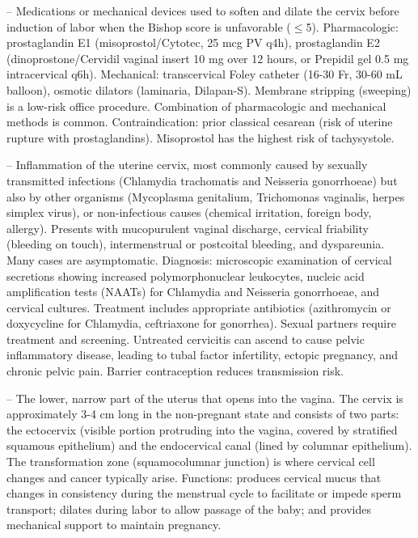 -- Medications or mechanical devices used to soften and dilate the cervix before induction of labor when the Bishop score is unfavorable (\(\le\)5). Pharmacologic: prostaglandin E1 (misoprostol/Cytotec, 25 mcg PV q4h), prostaglandin E2 (dinoprostone/Cervidil vaginal insert 10 mg over 12 hours, or Prepidil gel 0.5 mg intracervical q6h). Mechanical: transcervical Foley catheter (16-30 Fr, 30-60 mL balloon), osmotic dilators (laminaria, Dilapan-S). Membrane stripping (sweeping) is a low-risk office procedure. Combination of pharmacologic and mechanical methods is common. Contraindication: prior classical cesarean (risk of uterine rupture with prostaglandins). Misoprostol has the highest risk of tachysystole.

-- Inflammation of the uterine cervix, most commonly caused by sexually transmitted infections (Chlamydia trachomatis and Neisseria gonorrhoeae) but also by other organisms (Mycoplasma genitalium, Trichomonas vaginalis, herpes simplex virus), or non-infectious causes (chemical irritation, foreign body, allergy). Presents with mucopurulent vaginal discharge, cervical friability (bleeding on touch), intermenstrual or postcoital bleeding, and dyspareunia. Many cases are asymptomatic. Diagnosis: microscopic examination of cervical secretions showing increased polymorphonuclear leukocytes, nucleic acid amplification tests (NAATs) for Chlamydia and Neisseria gonorrhoeae, and cervical cultures. Treatment includes appropriate antibiotics (azithromycin or doxycycline for Chlamydia, ceftriaxone for gonorrhea). Sexual partners require treatment and screening. Untreated cervicitis can ascend to cause pelvic inflammatory disease, leading to tubal factor infertility, ectopic pregnancy, and chronic pelvic pain. Barrier contraception reduces transmission risk.

-- The lower, narrow part of the uterus that opens into the vagina. The cervix is approximately 3-4 cm long in the non-pregnant state and consists of two parts: the ectocervix (visible portion protruding into the vagina, covered by stratified squamous epithelium) and the endocervical canal (lined by columnar epithelium). The transformation zone (squamocolumnar junction) is where cervical cell changes and cancer typically arise. Functions: produces cervical mucus that changes in consistency during the menstrual cycle to facilitate or impede sperm transport; dilates during labor to allow passage of the baby; and provides mechanical support to maintain pregnancy.

